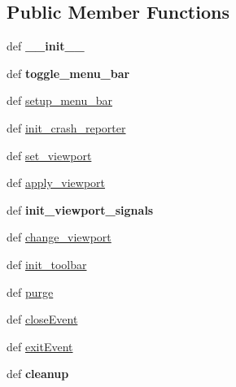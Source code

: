 \subsection*{Public Member Functions}
\begin{DoxyCompactItemize}
\item 
\hypertarget{classcommotion__client_1_1GUI_1_1main__window_1_1MainWindow_a74b56753628f84bf3e19c128ef1fda19}{def {\bfseries \-\_\-\-\_\-init\-\_\-\-\_\-}}\label{classcommotion__client_1_1GUI_1_1main__window_1_1MainWindow_a74b56753628f84bf3e19c128ef1fda19}

\item 
\hypertarget{classcommotion__client_1_1GUI_1_1main__window_1_1MainWindow_a39b23e6f4f95af7d703ec03be942a7df}{def {\bfseries toggle\-\_\-menu\-\_\-bar}}\label{classcommotion__client_1_1GUI_1_1main__window_1_1MainWindow_a39b23e6f4f95af7d703ec03be942a7df}

\item 
def \hyperlink{classcommotion__client_1_1GUI_1_1main__window_1_1MainWindow_abacf45b62be7d880089c913e3f2f7f24}{setup\-\_\-menu\-\_\-bar}
\item 
def \hyperlink{classcommotion__client_1_1GUI_1_1main__window_1_1MainWindow_a2c803d1583ec7b548f5b2a9cb2014e4d}{init\-\_\-crash\-\_\-reporter}
\item 
def \hyperlink{classcommotion__client_1_1GUI_1_1main__window_1_1MainWindow_ad4d493c20e1d9898eeb41da87622ea49}{set\-\_\-viewport}
\item 
def \hyperlink{classcommotion__client_1_1GUI_1_1main__window_1_1MainWindow_a2972ac997218f50db2c18762ac48f23c}{apply\-\_\-viewport}
\item 
\hypertarget{classcommotion__client_1_1GUI_1_1main__window_1_1MainWindow_abf5e8a0add7f4fa1480c825a74e0e9b9}{def {\bfseries init\-\_\-viewport\-\_\-signals}}\label{classcommotion__client_1_1GUI_1_1main__window_1_1MainWindow_abf5e8a0add7f4fa1480c825a74e0e9b9}

\item 
def \hyperlink{classcommotion__client_1_1GUI_1_1main__window_1_1MainWindow_a0e9201cd1165369bdac93cf1b4658c6f}{change\-\_\-viewport}
\item 
def \hyperlink{classcommotion__client_1_1GUI_1_1main__window_1_1MainWindow_a08bdbda447c256d0cf5355d928ebb3fe}{init\-\_\-toolbar}
\item 
def \hyperlink{classcommotion__client_1_1GUI_1_1main__window_1_1MainWindow_a8e3325a8253a30ff8d900203d52a6e08}{purge}
\item 
def \hyperlink{classcommotion__client_1_1GUI_1_1main__window_1_1MainWindow_ac4b4245d881e0bd8417098bbf39e5353}{close\-Event}
\item 
def \hyperlink{classcommotion__client_1_1GUI_1_1main__window_1_1MainWindow_ab74365d561c1a4d58b9dc0932263f95e}{exit\-Event}
\item 
\hypertarget{classcommotion__client_1_1GUI_1_1main__window_1_1MainWindow_a73b785fffb64b1ce044326102b3727fe}{def {\bfseries cleanup}}\label{classcommotion__client_1_1GUI_1_1main__window_1_1MainWindow_a73b785fffb64b1ce044326102b3727fe}


\end{DoxyCompactItemize}

